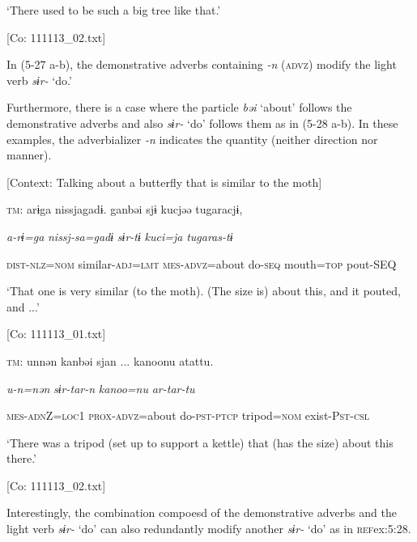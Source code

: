       ‘There used to be such a big tree like that.’

      [Co: 111113\_02.txt]
\z
\z

In (5-27 a-b), the demonstrative adverbs containing \textit{{}-n} (\textsc{advz}) modify the light verb \textit{sɨr-} ‘do.’

Furthermore, there is a case where the particle \textit{bəi} ‘about’ follows the demonstrative adverbs and also \textit{sɨr-} ‘do’ follows them as in (5-28 a-b). In these examples, the adverbializer \textit{{}-n} indicates the quantity (neither direction nor manner).

\ea \label{ex:5:28}  \ea \label{ex:5:28a} [Context: Talking about a butterfly that is similar to the moth]

    \textsc{tm}:  arɨga  nissjagadɨ.  ganbəi  sjɨ  kucjəə  tugaracjɨ,

      \textit{a-rɨ=ga}  \textit{nissj-sa=gadɨ}  \textit{}  \textit{sɨr-tɨ}  \textit{kuci=ja}  \textit{tugaras-tɨ}
                                                                                   
      \textsc{dist}-\textsc{nlz}=\textsc{nom}  similar-\textsc{adj}=\textsc{lmt}  \textsc{mes}-\textsc{advz}=about  do-\textsc{seq}     mouth=\textsc{top}  pout-SEQ

      ‘That one is very similar (to the moth). (The size is) about this, and it pouted, and ...’

      [Co: 111113\_01.txt]

 \ex \label{ex:5:b} \textsc{tm}:  unnən  kanbəi  sjan  ...   kanoonu  atattu.
                                                               
      \textit{u-n=nən}  \textit{}  \textit{sɨr-tar-n} \textit{kanoo=nu}  \textit{ar-tar-tu}     
                                                              
      \textsc{mes}-\textsc{adn}Z=\textsc{loc}1  \textsc{prox}-\textsc{advz}=about  do-\textsc{pst}-\textsc{ptcp}   tripod=\textsc{nom}  exist-P\textsc{st}-\textsc{csl}

      ‘There was a tripod (set up to support a kettle) that (has the size) about this there.’

      [Co: 111113\_02.txt]
\z
\z

Interestingly, the combination compoesd of the demonstrative adverbs and the light verb \textit{sɨr-} ‘do’ can also redundantly modify another \textit{sɨr-} ‘do’ as in \textsc{ref}{ex:5:28}.

